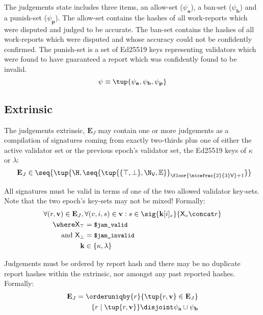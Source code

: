 The judgements state includes three items, an allow-set ($\psi_\mathbf{a}$), a ban-set ($\psi_\mathbf{b}$) and a punish-set ($\psi_\mathbf{p}$). The allow-set contains the hashes of all work-reports which were disputed and judged to be accurate. The ban-set contains the hashes of all work-reports which were disputed and whose accuracy could not be confidently confirmed. The punish-set is a set of Ed25519 keys representing validators which were found to have guaranteed a report which was confidently found to be invalid.
\begin{equation}
  \psi \equiv \tup{\psi_\mathbf{a}, \psi_\mathbf{b}, \psi_\mathbf{p}}
\end{equation}

\subsection{Extrinsic}

The judgements extrinsic, $\mathbf{E}_J$ may contain one or more judgements as a compilation of signatures coming from exactly two-thirds plus one of either the active validator set or the previous epoch's validator set, \ie the Ed25519 keys of $\kappa$ or $\lambda$:
\begin{equation}
  \mathbf{E}_J \in \seq{\tup{\H, \seq{\tup{\{\top, \bot\}, \N_{\mathsf{V}}, \mathbb{E}}}_{\floor{\nicefrac{2}{3}\mathsf{V}} + 1}}}\!\!\!
\end{equation}

All signatures must be valid in terms of one of the two allowed validator key-sets. Note that the two epoch's key-sets may not be mixed! Formally:
\begin{equation}
  \begin{aligned}
    \forall (r, \mathbf{v}) \in \mathbf{E}_J ,\, &\forall (v, i, s) \in \mathbf{v} : s \in \sig{\mathbf{k}[i]_e}{\mathsf{X}_v \concat r}\\
    \where \mathsf{X}_\top &= \text{{\small \texttt{\$jam\_valid}}} \\
    \text{and } \mathsf{X}_\bot &= \text{{\small \texttt{\$jam\_invalid}}} \\
    \mathbf{k} &\in \{ \kappa , \lambda \}
  \end{aligned}
\end{equation}

Judgements must be ordered by report hash and there may be no duplicate report hashes within the extrinsic, nor amongst any past reported hashes. Formally:
\begin{align}
  \mathbf{E}_J = \orderuniqby{r}{\tup{r, \mathbf{v}} \in \mathbf{E}_J} \\
  \{r \mid \tup{r, \mathbf{v}}\} \disjoint \psi_\mathbf{a} \cup \psi_\mathbf{b}
\end{align}

